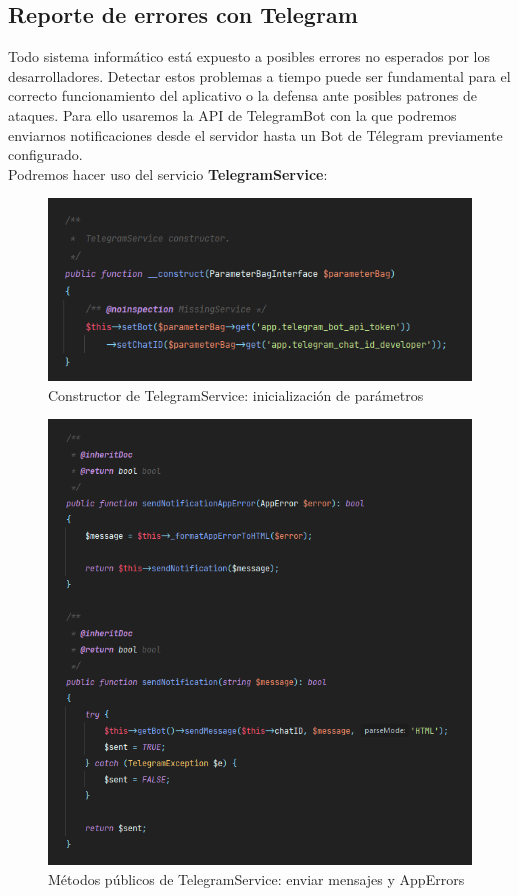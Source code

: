 \subsection{Reporte de errores con Telegram} 

Todo sistema informático está expuesto a posibles errores no esperados por los desarrolladores. Detectar estos problemas a tiempo puede ser fundamental para el correcto funcionamiento del aplicativo o la defensa ante posibles patrones de ataques.
Para ello usaremos la API de TelegramBot \cite{telegrambot} con la que podremos enviarnos notificaciones desde el servidor hasta un Bot de Télegram previamente configurado.\\
Podremos hacer uso del servicio \textbf{TelegramService}:

\begin{figure}[H]
  \centering
  \includegraphics[scale=0.8]{images/telegram-service-0.png}
  \caption{Constructor de TelegramService: inicialización de parámetros}
  \label{}
\end{figure}

\begin{figure}[H]
  \centering
  \includegraphics[scale=0.8]{images/telegram-service-1.png}
  \caption{Métodos públicos de TelegramService: enviar mensajes y AppErrors}
  \label{}
\end{figure}

